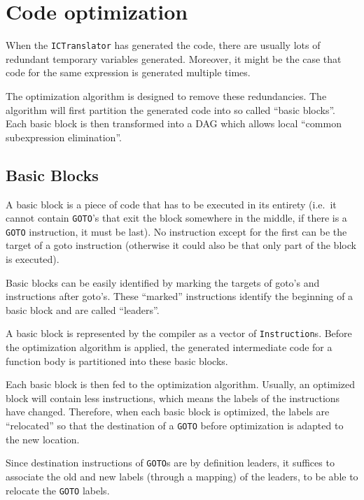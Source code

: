 \documentclass[a4paper]{article}
\begin{document}
\section{Code optimization}

When the \texttt{ICTranslator} has generated the code, there are usually lots
of redundant temporary variables generated. Moreover, it might be the case
that code for the same expression is generated multiple times.

The optimization algorithm is designed to remove these redundancies. The
algorithm will first partition the generated code into so called ``basic
blocks''. Each basic block is then transformed into a DAG which allows local
``common subexpression elimination''.

\subsection{Basic Blocks}

A basic block is a piece of code that has to be executed in its entirety
(i.e.~it cannot contain \texttt{GOTO}'s that exit the block somewhere in the
middle, if there is a \texttt{GOTO} instruction, it must be last). No
instruction except for the first can be the target of a goto instruction
(otherwise it could also be that only part of the block is executed).

Basic blocks can be easily identified by marking the targets of goto's and
instructions after goto's. These ``marked'' instructions identify the
beginning of a basic block and are called ``leaders''.

A basic block is represented by the compiler as a vector of \texttt{Instruction}s.
Before the optimization algorithm is applied, the generated intermediate code
for a function body is partitioned into these basic blocks.

Each basic block is then fed to the optimization algorithm. Usually,
an optimized block will contain less instructions, which means the labels of
the instructions have changed. Therefore, when each basic block is optimized,
the labels are ``relocated'' so that the destination of a \texttt{GOTO} before
optimization is adapted to the new location.

Since destination instructions of \texttt{GOTO}s are by definition leaders,
it suffices to associate the old and new labels (through a mapping) of the
leaders, to be able to relocate the \texttt{GOTO} labels.
\end{document}
